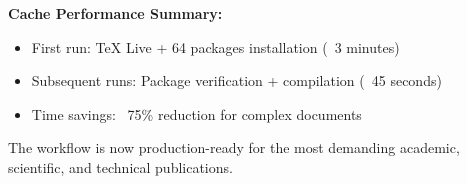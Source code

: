 \documentclass[12pt,a4paper,twoside]{article}
\theoremstyle{definition}
\begin{document}
\textbf{Cache Performance Summary:}
\begin{itemize}
\item First run: TeX Live + 64 packages installation (~3 minutes)
\item Subsequent runs: Package verification + compilation (~45 seconds)
\item Time savings: ~75\% reduction for complex documents
\end{itemize}

The workflow is now production-ready for the most demanding academic, scientific, and technical publications.
\end{document}
